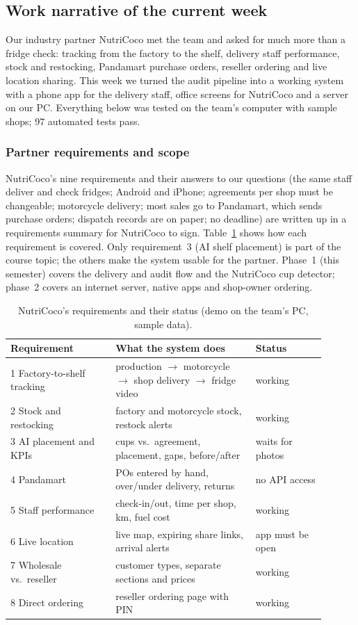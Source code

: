 \subsection{Work narrative of the current week}
Our industry partner NutriCoco met the team and asked for much more than a fridge check: tracking from
the factory to the shelf, delivery staff performance, stock and restocking, Pandamart purchase orders,
reseller ordering and live location sharing. This week we turned the audit pipeline into a working
system with a phone app for the delivery staff, office screens for NutriCoco and a server on our PC.
Everything below was tested on the team's computer with sample shops; 97 automated tests pass.

\subsubsection{Partner requirements and scope}
NutriCoco's nine requirements and their answers to our questions (the same staff deliver and check
fridges; Android and iPhone; agreements per shop must be changeable; motorcycle delivery; most sales go
to Pandamart, which sends purchase orders; dispatch records are on paper; no deadline) are written up in
a requirements summary for NutriCoco to sign. Table~\ref{tab:r5-scope} shows how each requirement is
covered. Only requirement~3 (AI shelf placement) is part of the course topic; the others make the
system usable for the partner. Phase~1 (this semester) covers the delivery and audit flow and the
NutriCoco cup detector; phase~2 covers an internet server, native apps and shop-owner ordering.

\begin{table}[!t]
\centering
\caption{NutriCoco's requirements and their status (demo on the team's PC, sample data).}
\label{tab:r5-scope}
\begin{tabular}{p{0.30\linewidth}p{0.40\linewidth}p{0.20\linewidth}}
\hline
Requirement & What the system does & Status \\
\hline
1 Factory-to-shelf tracking & production $\rightarrow$ motorcycle $\rightarrow$ shop delivery $\rightarrow$ fridge video & working \\
2 Stock and restocking & factory and motorcycle stock, restock alerts & working \\
3 AI placement and KPIs & cups vs.\ agreement, placement, gaps, before/after & waits for photos \\
4 Pandamart & POs entered by hand, over/under delivery, returns & no API access \\
5 Staff performance & check-in/out, time per shop, km, fuel cost & working \\
6 Live location & live map, expiring share links, arrival alerts & app must be open \\
7 Wholesale vs.\ reseller & customer types, separate sections and prices & working \\
8 Direct ordering & reseller ordering page with PIN & working \\
\hline
\end{tabular}
\end{table}

